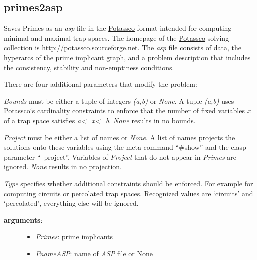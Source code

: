 \documentclass[letterpaper,10pt,english]{sphinxmanual}
\begin{document}
\subsection{primes2asp}
\label{AspSolver:primes2asp}\label{AspSolver:id8}

\begin{fulllineitems}
\label{AspSolver:PyBoolNet.AspSolver.primes2asp}
Saves Primes as an \emph{asp} file in the \href{http://potassco.sourceforge.net/}{Potassco} format intended for computing minimal and maximal trap spaces.
The homepage of the \href{http://potassco.sourceforge.net/}{Potassco} solving collection is \href{http://potassco.sourceforge.net}{http://potassco.sourceforge.net}.
The \emph{asp} file consists of data, the hyperarcs of the prime implicant graph,
and a problem description that includes the consistency, stability and non-emptiness conditions.

There are four additional parameters that modify the problem:

\emph{Bounds} must be either a tuple of integers \emph{(a,b)} or \emph{None}.
A tuple \emph{(a,b)} uses \href{http://potassco.sourceforge.net/}{Potassco}`s cardinality constraints to enforce that the number of fixed variables \emph{x} of a trap space satisfies \emph{a\textless{}=x\textless{}=b}.
\emph{None} results in no bounds.

\emph{Project} must be either a list of names or \emph{None}.
A list of names projects the solutions onto these variables using the meta command ``\#show'' and the clasp parameter ``--project''.
Variables of \emph{Project} that do not appear in \emph{Primes} are ignored.
\emph{None} results in no projection.

\emph{Type} specifies whether additional constraints should be enforced.
For example for computing circuits or percolated trap spaces.
Recognized values are `circuits' and `percolated', everything else will be ignored.
\begin{description}
\item[{\textbf{arguments}:}] \leavevmode\begin{itemize}
\item {} 
\emph{Primes}: prime implicants

\item {} 
\emph{FnameASP}: name of \emph{ASP} file or None


\end{itemize}
\end{description}
\end{fulllineitems}
\end{document}
